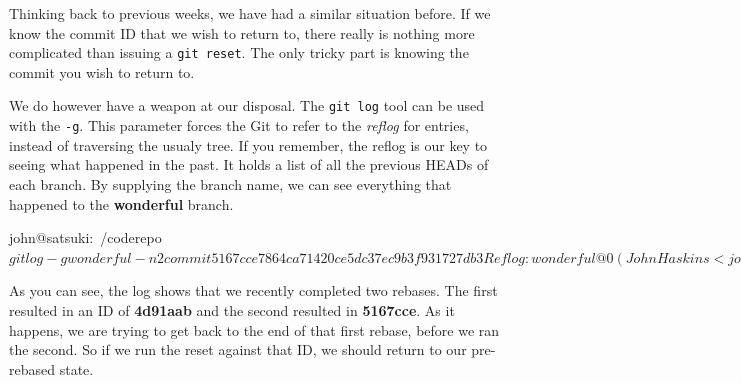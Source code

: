 Thinking back to previous weeks, we have had a similar situation before.
If we know the commit ID that we wish to return to, there really is nothing more complicated than issuing a \texttt{git reset}.
The only tricky part is knowing the commit you wish to return to.

We do however have a weapon at our disposal.
The \texttt{git log} tool can be used with the \texttt{-g}.
This parameter forces the Git to refer to the \emph{reflog} for entries, instead of traversing the usualy tree.
If you remember, the reflog is our key to seeing what happened in the past.
It holds a list of all the previous HEADs of each branch.
By supplying the branch name, we can see everything that happened to the \textbf{wonderful} branch.

\begin{code}
john@satsuki:~/coderepo$ git log -g wonderful -n2
commit 5167cce7864ca71420ce5dc37ec9b3f931727db3
Reflog: wonderful@{0} (John Haskins <john.haskins@tamagoyakiinc.koala>)
Reflog message: rebase finished: refs/heads/wonderful onto f8d5100142b43ffaba9bb
Author: John Haskins <john.haskins@tamagoyakiinc.koala>
Date:   Wed Jul 6 09:30:40 2011 +0100

    Updated another file again

commit 4d91aab57aaad020e62486805e25d0d6f06fdc3e
Reflog: wonderful@{1} (John Haskins <john.haskins@tamagoyakiinc.koala>)
Reflog message: rebase -i (finish): refs/heads/wonderful onto 1c3206a
Author: John Haskins <john.haskins@tamagoyakiinc.koala>
Date:   Wed Jul 6 09:30:40 2011 +0100

    Updated another file again
john@satsuki:~/coderepo$
\end{code}

As you can see, the log shows that we recently completed two rebases.
The first resulted in an ID of \textbf{4d91aab} and the second resulted in \textbf{5167cce}.
As it happens, we are trying to get back to the end of that first rebase, before we ran the second.
So if we run the reset against that ID, we should return to our pre-rebased state.


